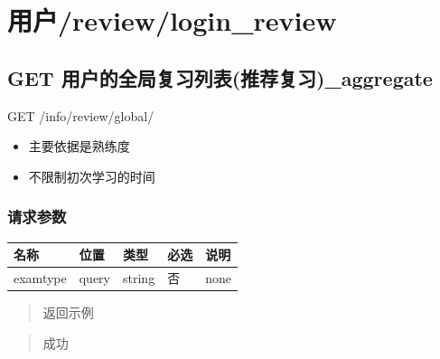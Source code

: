 \documentclass[
]{article}
\begin{document}
\hypertarget{ux7528ux6237reviewloginreview}{%
\section{用户/review/login\_review}\label{ux7528ux6237reviewloginreview}}

\hypertarget{get-ux7528ux6237ux7684ux5168ux5c40ux590dux4e60ux5217ux8868ux63a8ux8350ux590dux4e60aggregate}{%
\subsection{GET
用户的全局复习列表(推荐复习)\_aggregate}\label{get-ux7528ux6237ux7684ux5168ux5c40ux590dux4e60ux5217ux8868ux63a8ux8350ux590dux4e60aggregate}}

GET /info/review/global/

\begin{itemize}
\item
  主要依据是熟练度
\item
  不限制初次学习的时间
\end{itemize}

\hypertarget{ux8bf7ux6c42ux53c2ux6570-42}{%
\subsubsection{请求参数}\label{ux8bf7ux6c42ux53c2ux6570-42}}

\begin{longtable}[]{@{}lllll@{}}
\toprule
名称 & 位置 & 类型 & 必选 & 说明 \\
\midrule
\endhead
examtype & query & string & 否 & none \\
\bottomrule
\end{longtable}

\begin{quote}
返回示例
\end{quote}

\begin{quote}
成功
\end{quote}
\end{document}

